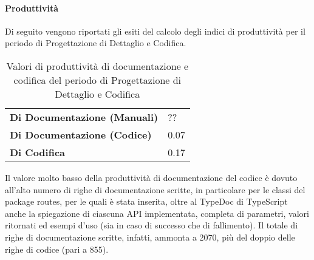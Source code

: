 \paragraph*{Produttività}
Di seguito vengono riportati gli esiti del calcolo degli indici di produttività per il periodo di Progettazione di Dettaglio e Codifica.
\begin{table}[H]
\centering
\begin{tabular}{|l|l|}
\cline{1-2}
\textbf{Di Documentazione (Manuali)} & ?? \\ \cline{1-2} %
\textbf{Di Documentazione (Codice)} & 0.07 \\ \cline{1-2} %
\textbf{Di Codifica} & 0.17 \\ \cline{1-2} %
\end{tabular}
\caption{Valori di produttività di documentazione e codifica del periodo di Progettazione di Dettaglio e Codifica}
\end{table}
Il valore molto basso della produttività di documentazione del codice è dovuto all'alto numero di righe di documentazione scritte, in particolare per le classi del package routes, per le quali è stata inserita, oltre al TypeDoc di TypeScript anche la spiegazione di ciascuna API implementata, completa di parametri, valori ritornati ed esempi d'uso (sia in caso di successo che di fallimento). Il totale di righe di documentazione scritte, infatti, ammonta a 2070, più del doppio delle righe di codice (pari a 855).